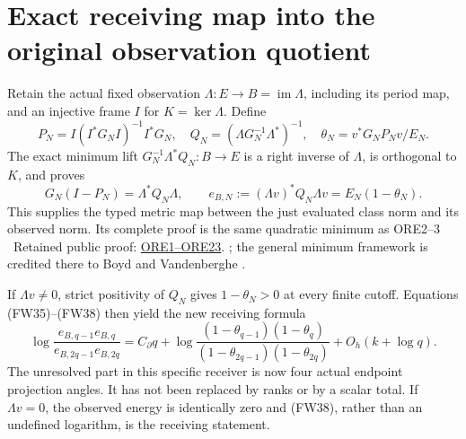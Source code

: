 \documentclass[11pt]{article}
\begin{document}
\section{Exact receiving map into the original observation quotient}
Retain the actual fixed observation $\Lambda:E\to B=\operatorname{im}\Lambda$,
including its period map, and an injective frame $I$ for $K=\ker\Lambda$.
Define
\begin{equation}\tag{FW37}
 P_N=I(I^*G_NI)^{-1}I^*G_N,\quad
 Q_N=(\Lambda G_N^{-1}\Lambda^*)^{-1},\quad
 \theta_N=v^*G_NP_Nv/E_N.
\end{equation}
The exact minimum lift $G_N^{-1}\Lambda^*Q_N:B\to E$ is a right
inverse of $\Lambda$, is orthogonal to $K$, and proves
\begin{equation}\tag{FW38}
 G_N(I-P_N)=\Lambda^*Q_N\Lambda,\qquad
 e_{B,N}:=(\Lambda v)^*Q_N\Lambda v=E_N(1-\theta_N).
\end{equation}
This supplies the typed metric map between the just evaluated class norm
and its observed norm. Its complete proof is the same quadratic minimum
as ORE2--3 \cite{ore}%
~Retained public proof: \href{https://github.com/KokunoYumeto/zeta-function-research-reader/blob/689a8f87e9c12b7a99b01b3123438c6751ee608f/workbenches/splitzero-tandem/continuations/20260919-full-window-source-products/providers/OBSERVATION_RESPONSE_EVOLUTION.tex\#L20}{ORE1--ORE23}.%
{}; the general minimum framework is credited there
to Boyd and Vandenberghe \cite[Appendix C.4.1]{Boyd}.

If $\Lambda v\ne0$, strict positivity of $Q_N$ gives $1-\theta_N>0$
at every finite cutoff. Equations (FW35)--(FW38) then yield the new
receiving formula
\begin{equation}\tag{FW39}
 \boxed{\log\frac{e_{B,q-1}e_{B,q}}{e_{B,2q-1}e_{B,2q}}
 =C_\partial q+
 \log\frac{(1-\theta_{q-1})(1-\theta_q)}
               {(1-\theta_{2q-1})(1-\theta_{2q})}
 +O_h(k+\log q).}
\end{equation}
The unresolved part in this specific receiver is now four actual endpoint
projection angles. It has not been replaced by ranks or by a scalar total.
If $\Lambda v=0$, the observed energy is identically zero and (FW38),
rather than an undefined logarithm, is the receiving statement.
\end{document}
